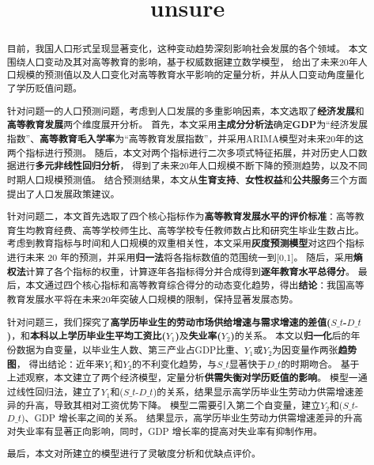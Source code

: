 \documentclass[withoutpreface,bwprint]{cumcmthesis} %
\title{unsure}
\begin{document}
\maketitle
\begin{abstract}

目前，我国人口形式呈现显著变化，这种变动趋势深刻影响社会发展的各个领域。
本文围绕人口变动及其对高等教育的影响，基于权威数据建立数学模型，
给出了未来20年人口规模的预测值以及人口变化对高等教育水平影响的定量分析，并从人口变动角度量化了学历贬值问题。

针对问题一的人口预测问题，考虑到人口发展的多重影响因素，本文选取了\textbf{经济发展}和\textbf{高等教育发展}两个维度展开分析。
首先，本文采用\textbf{主成分分析法}确定\textbf{GDP}为“经济发展指数”、\textbf{高等教育毛入学率}为“高等教育发展指数”，并采用ARIMA模型对未来20年的这两个指标进行预测。
随后，本文对两个指标进行二次多项式特征拓展，并对历史人口数据进行\textbf{多元非线性回归分析}，
得到了未来20年人口规模不断下降的预测趋势，以及不同时期人口规模预测值。
结合预测结果，本文从\textbf{生育支持}、\textbf{女性权益}和\textbf{公共服务}三个方面提出了人口发展政策建议。

针对问题二，本文首先选取了四个核心指标作为\textbf{高等教育发展水平的评价标准}：高等教育生均教育经费、高等学校师生比、高等学校专任教师数占比和研究生毕业生数占比。
考虑到教育指标与时间和人口规模的双重相关性，本文采用\textbf{灰度预测模型}对这四个指标进行未来 20 年的预测，并采用\textbf{归一法}将各指标数值的范围统一到[0,1]。
随后，采用\textbf{熵权法}计算了各个指标的权重，计算逐年各指标得分并合成得到\textbf{逐年教育水平总得分}。
最后，本文通过四个核心指标和高等教育综合得分的动态变化趋势，得出\textbf{结论}：我国高等教育发展水平将在未来20年突破人口规模的限制，保持显著发展态势。

针对问题三，我们探究了\textbf{高学历毕业生的劳动市场供给增速与需求增速的差值($S\_{t}$-$D\_{t}$)}，和\textbf{本科以上学历毕业生平均工资比($Y_1$)}及\textbf{失业率($Y_2$)}的关系。
本文以\textbf{归一化}后的年份数据为自变量，以毕业生人数、第三产业占GDP比重、$Y_1$或$Y_2$为因变量作两张\textbf{趋势图}，
得出结论：近年来$Y_1$和$Y_2$的不利变化趋势，与$S\_{t}$显著快于$D\_{t}$的时期吻合。
基于上述观察，本文建立了两个经济模型，定量分析\textbf{供需失衡对学历贬值的影响}。
模型一通过线性回归法，建立了$Y_1$和($S\_{t}$-$D\_{t}$)的关系，结果显示高学历毕业生劳动力供需增速差异的升高，导致其相对工资优势下降。
模型二需要引入第二个自变量，建立$Y_2$和($S\_{t}$-$D\_{t}$)、GDP 增长率之间的关系。
结果显示，高学历毕业生劳动力供需增速差异的升高对失业率有显著正向影响，同时，GDP 增长率的提高对失业率有抑制作用。

最后，本文对所建立的模型进行了灵敏度分析和优缺点评价。


\keywords{\quad \quad    } %

\end{abstract}
\end{document}
